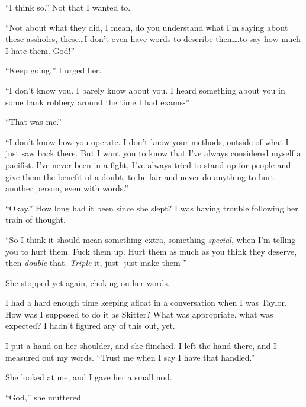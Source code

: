 ``I think so.''  Not that I wanted to.



``Not about what they did, I mean, do you understand what I'm saying about these assholes, these\ldots I don't even have words to describe them\ldots to say how much I hate them.  God!''



``Keep going,'' I urged her.



``I don't know you.  I barely know about you.  I heard something about you in some bank robbery around the time I had exams-''



``That was me.''



``I don't know how you operate.  I don't know your methods, outside of what I just saw back there.  But I want you to know that I've always considered myself a pacifist.  I've never been in a fight, I've always tried to stand up for people and give them the benefit of a doubt, to be fair and never do anything to hurt another person, even with words.''



``Okay.''  How long had it been since she slept?  I was having trouble following her train of thought.



``So I think it should mean something extra, something \emph{special}, when I'm telling you to hurt them.  Fuck them up.  Hurt them as much as you think they deserve, then \emph{double} that.  \emph{Triple} it, just- just make them-''



She stopped yet again, choking on her words.



I had a hard enough time keeping afloat in a conversation when I was Taylor.  How was I supposed to do it as Skitter?  What was appropriate, what was expected?  I hadn't figured any of this out, yet.



I put a hand on her shoulder, and she flinched.  I left the hand there, and I measured out my words.  ``Trust me when I say I have that handled.''



She looked at me, and I gave her a small nod.



``God,'' she muttered.



